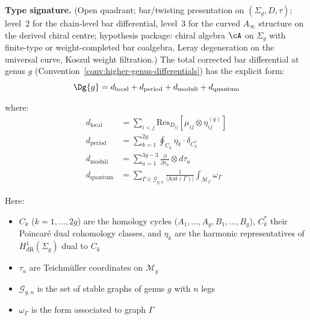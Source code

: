 \begin{theorem}\label{thm:higher-genus-diff}
\textbf{Type signature.} (Open quadrant; bar/twisting presentation on
$(\Sigma_g, D, \tau)$; level~$2$ for the chain-level bar differential,
level~$3$ for the curved $A_\infty$ structure on the derived chiral
centre; hypothesis package: chiral algebra $\cA$ on $\Sigma_g$ with
finite-type or weight-completed bar coalgebra, Leray degeneration on
the universal curve, Koszul weight filtration.)
The total corrected bar differential at genus $g$
\textup{(}Convention~\textup{\ref{conv:higher-genus-differentials})} has the explicit form:
\[\Dg{g} = d_{\text{local}} + d_{\text{period}} + d_{\text{moduli}} + d_{\text{quantum}}\]

where:
\begin{align}
d_{\text{local}} &= \sum_{i<j} \text{Res}_{D_{ij}} \left[\mu_{ij} \otimes \eta_{ij}^{(g)}\right] \\
d_{\text{period}} &= \sum_{k=1}^{2g} \oint_{C_k} \eta_k \cdot \delta_{C_k^*} \\
d_{\text{moduli}} &= \sum_{a=1}^{3g-3} \frac{\partial}{\partial \tau_a} \otimes d\tau_a \\
d_{\text{quantum}} &= \sum_{\Gamma \in \mathcal{G}_{g,n}} \frac{1}{|\text{Aut}(\Gamma)|} \int_{\mathcal{M}_\Gamma} \omega_\Gamma
\end{align}

Here:
\begin{itemize}
\item $C_k$ ($k = 1, \ldots, 2g$) are the homology cycles ($A_1,\ldots,A_g,B_1,\ldots,B_g$), $C_k^*$ their Poincar\'e dual cohomology classes, and $\eta_k$ are the harmonic representatives of $H^1_{\mathrm{dR}}(\Sigma_g)$ dual to $C_k$
\item $\tau_a$ are Teichmüller coordinates on $\mathcal{M}_g$
\item $\mathcal{G}_{g,n}$ is the set of stable graphs of genus $g$ with $n$ legs
\item $\omega_\Gamma$ is the form associated to graph $\Gamma$
\end{itemize}
\end{theorem}


